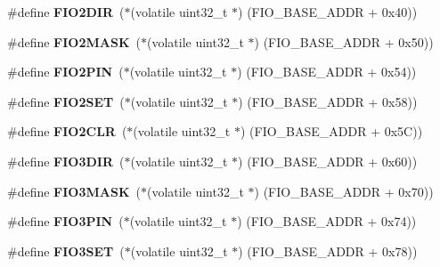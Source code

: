 \begin{DoxyCompactItemize}
\#define {\bfseries F\+I\+O2\+D\+IR}~($\ast$(volatile uint32\+\_\+t $\ast$) (F\+I\+O\+\_\+\+B\+A\+S\+E\+\_\+\+A\+D\+DR + 0x40))
\item 
\mbox{\label{group__lpc24xx__regs_gad27e95ce6805c27eef26ea73ceb023bd}} 
\#define {\bfseries F\+I\+O2\+M\+A\+SK}~($\ast$(volatile uint32\+\_\+t $\ast$) (F\+I\+O\+\_\+\+B\+A\+S\+E\+\_\+\+A\+D\+DR + 0x50))
\item 
\mbox{\label{group__lpc24xx__regs_ga3231320a27b790a99f2d28fc5d32b33c}} 
\#define {\bfseries F\+I\+O2\+P\+IN}~($\ast$(volatile uint32\+\_\+t $\ast$) (F\+I\+O\+\_\+\+B\+A\+S\+E\+\_\+\+A\+D\+DR + 0x54))
\item 
\mbox{\label{group__lpc24xx__regs_gaeb2827cc8f7918902c58cdc9960e840d}} 
\#define {\bfseries F\+I\+O2\+S\+ET}~($\ast$(volatile uint32\+\_\+t $\ast$) (F\+I\+O\+\_\+\+B\+A\+S\+E\+\_\+\+A\+D\+DR + 0x58))
\item 
\mbox{\label{group__lpc24xx__regs_ga1195f7a120c7cb4f8fbb23b72e8ec037}} 
\#define {\bfseries F\+I\+O2\+C\+LR}~($\ast$(volatile uint32\+\_\+t $\ast$) (F\+I\+O\+\_\+\+B\+A\+S\+E\+\_\+\+A\+D\+DR + 0x5\+C))
\item 
\mbox{\label{group__lpc24xx__regs_ga1083e6b4f9db146360ddd0dcd0a9dd39}} 
\#define {\bfseries F\+I\+O3\+D\+IR}~($\ast$(volatile uint32\+\_\+t $\ast$) (F\+I\+O\+\_\+\+B\+A\+S\+E\+\_\+\+A\+D\+DR + 0x60))
\item 
\mbox{\label{group__lpc24xx__regs_ga9f4d031bd0cbecf049e020fbd3b85944}} 
\#define {\bfseries F\+I\+O3\+M\+A\+SK}~($\ast$(volatile uint32\+\_\+t $\ast$) (F\+I\+O\+\_\+\+B\+A\+S\+E\+\_\+\+A\+D\+DR + 0x70))
\item 
\mbox{\label{group__lpc24xx__regs_ga3656d6446be846bded1ddf3bbb1f069c}} 
\#define {\bfseries F\+I\+O3\+P\+IN}~($\ast$(volatile uint32\+\_\+t $\ast$) (F\+I\+O\+\_\+\+B\+A\+S\+E\+\_\+\+A\+D\+DR + 0x74))
\item 
\mbox{\label{group__lpc24xx__regs_ga7b26871215344e5a9df44d7093240432}} 
\#define {\bfseries F\+I\+O3\+S\+ET}~($\ast$(volatile uint32\+\_\+t $\ast$) (F\+I\+O\+\_\+\+B\+A\+S\+E\+\_\+\+A\+D\+DR + 0x78))

\end{DoxyCompactItemize}
